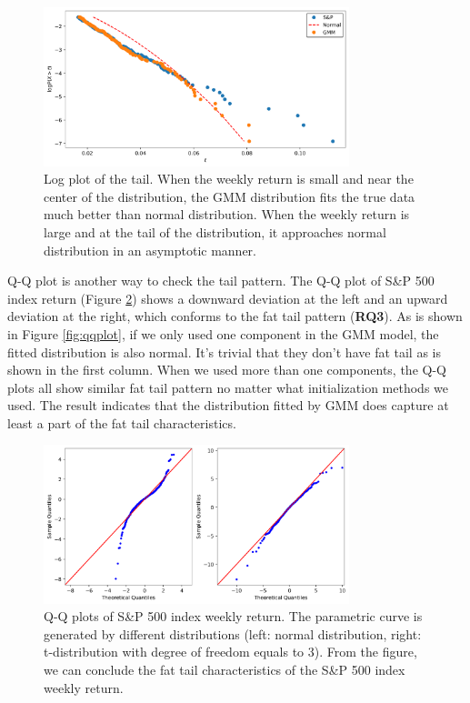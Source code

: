 \documentclass[10pt,journal,compsoc]{IEEEtran}
\begin{document}
     \begin{figure}[h]
        \centering
        \includegraphics[width=3.5in]{figures/log_plot_tail.png}
        \caption{Log plot of the tail. When the weekly return is small and near the center of the distribution, the GMM distribution fits the true data much better than normal distribution. When the weekly return is large and at the tail of the distribution, it approaches normal distribution in an asymptotic manner.}
        \label{fig:log_plot_tail}
    \end{figure}
     
    
    Q-Q plot is another way to check the tail pattern. The Q-Q plot of S\&P 500 index return (Figure \ref{fig:qqplot_sp}) shows a downward deviation at the left and an upward deviation at the right, which conforms to the fat tail pattern (\textbf{RQ3}). As is shown in Figure \ref{fig:qqplot}, if we only used one component in the GMM model, the fitted distribution is also normal. It's trivial that they don't have fat tail as is shown in the first column. When we used more than one components, the Q-Q plots all show similar fat tail pattern no matter what initialization methods we used. The result indicates that the distribution fitted by GMM does capture at least a part of the fat tail characteristics.
    
        \begin{figure}[h]
        \centering
        \includegraphics[width=3.5in]{figures/qqplot_sp.png}
        \caption{Q-Q plots of S\&P 500 index weekly return. The parametric curve is generated by different distributions (left: normal distribution, right: t-distribution with degree of freedom equals to 3). From the figure, we can conclude the fat tail characteristics of the S\&P 500 index weekly return.}
        \label{fig:qqplot_sp}
    \end{figure}
    
\end{document}

